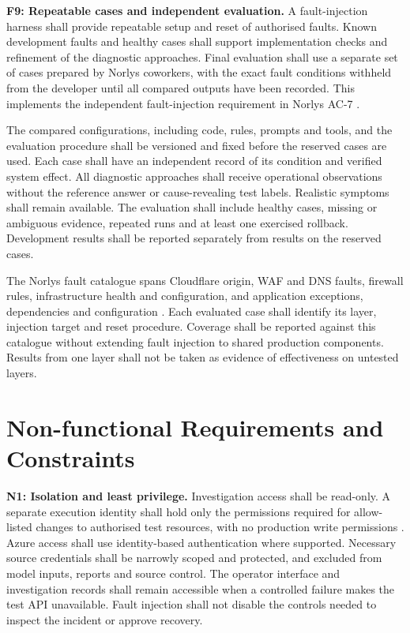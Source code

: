 \noindent\textbf{F9: Repeatable cases and independent evaluation.}
A fault-injection harness shall provide repeatable setup and reset of
authorised faults. Known development faults and healthy cases shall support
implementation checks and refinement of the diagnostic approaches. Final
evaluation shall use a separate set of cases prepared by Norlys coworkers,
with the exact fault conditions withheld from the developer until all
compared outputs have been recorded. This implements the independent
fault-injection requirement in Norlys AC-7
\parencite[AC-7]{norlys_operations_agents}.

The compared configurations, including code, rules, prompts and tools,
and the evaluation procedure shall be versioned and fixed before the
reserved cases are used. Each case shall have an independent record of its
condition and verified system effect. All diagnostic approaches shall
receive operational observations without the reference answer or
cause-revealing test labels. Realistic symptoms shall remain available.
The evaluation shall include healthy cases, missing or ambiguous evidence,
repeated runs and at least one exercised rollback. Development results
shall be reported separately from results on the reserved cases.

The Norlys fault catalogue spans Cloudflare origin, WAF and DNS faults,
firewall rules, infrastructure health and configuration, and application
exceptions, dependencies and configuration
\parencite[AC-7]{norlys_operations_agents}. Each evaluated case shall
identify its layer, injection target and reset procedure. Coverage shall
be reported against this catalogue without extending fault injection to
shared production components. Results from one layer shall not be taken
as evidence of effectiveness on untested layers.

\section{Non-functional Requirements and Constraints}
\label{sec:requirements:constraints}

\noindent\textbf{N1: Isolation and least privilege.}
Investigation access shall be read-only. A separate execution identity
shall hold only the permissions required for allow-listed changes to
authorised test resources, with no production write permissions
\parencite[AC-1, AC-5]{norlys_operations_agents}. Azure access shall use
identity-based authentication where supported. Necessary source credentials
shall be narrowly scoped and protected, and excluded from model inputs,
reports and source control.
The operator interface and investigation records shall remain accessible
when a controlled failure makes the test API unavailable. Fault injection
shall not disable the controls needed to inspect the incident or approve
recovery.


